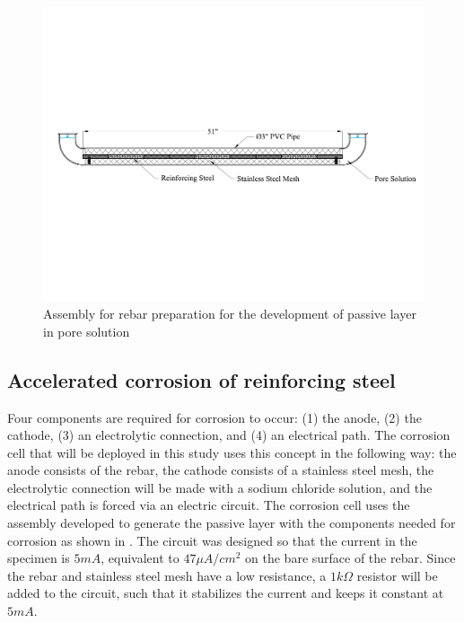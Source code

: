 \begin{figure}[htbp]
	\centering
	\includegraphics[width=1.0\textwidth]{Chapter-3/figs/AnodicPolarization_01}
	\caption{Assembly for rebar preparation for the development of passive layer in pore solution}
	\label{fig:RebarPassivation}
\end{figure}

\newpage
\subsection{Accelerated corrosion  of reinforcing steel}

Four components are required for corrosion to occur: (1) the anode, (2) the cathode, (3) an electrolytic connection, and (4) an electrical path. The corrosion cell that will be deployed in this study uses this concept in the following way: the anode consists of the rebar, the cathode consists of a stainless steel mesh, the electrolytic connection will be made with a sodium chloride solution, and the electrical path is forced via an electric circuit. The corrosion cell uses the assembly developed to generate the passive layer with the components needed for corrosion as shown in . The circuit was designed so that the current in the specimen is $5mA$, equivalent to $47\mu A/cm^2$ on the bare surface of the rebar. Since the rebar and stainless steel mesh have a low resistance, a $1k\Omega$ resistor will be added to the circuit, such that it stabilizes the current and keeps it constant at $5mA$.

